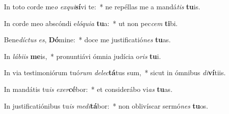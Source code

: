 \item In toto corde me\textit{o} \textit{ex}\textit{qui}\textbf{sí}vi te:~* ne repéllas me a mandá\textit{tis} \textbf{tu}is.
\item In corde meo abscóndi e\textit{ló}\textit{qui}\textit{a} \textbf{tu}a:~* ut non pec\textit{cem} \textbf{ti}bi.
\item Bene\textit{díc}\textit{tus} \textit{es}, \textbf{Dó}mine:~* doce me justificatió\textit{nes} \textbf{tu}as.
\item In \textit{lá}\textit{bi}\textit{is} \textbf{me}is,~* pronuntiávi ómnia judícia o\textit{ris} \textbf{tu}i.
\item In via testimoniórum tuó\textit{rum} \textit{de}\textit{lec}\textbf{tá}tus sum,~* sicut in ómnibus \textit{di}\textbf{ví}tiis.
\item In mandátis tu\textit{is} \textit{ex}\textit{er}\textbf{cé}bor:~* et considerábo vi\textit{as} \textbf{tu}as.
\item In justificatiónibus tu\textit{is} \textit{me}\textit{di}\textbf{tá}bor:~* non oblivíscar sermó\textit{nes} \textbf{tu}os.
